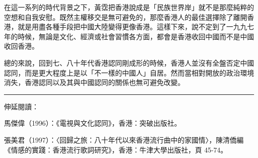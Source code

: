 在這一系列的時代背景之下，黃霑把香港說成是「民族世界岸」就不是那麼純粹的空想和自我安慰。既然主權移交是無可避免的，那麼香港人的最佳選擇除了離開香港，就是用盡各種手段把中國大陸變得更像香港。這樣下來，說不定到了一九九七年的時候，無論是文化、經濟或社會習慣各方面，都會是香港收回中國而不是中國收回香港。

總的來說，回到七、八十年代香港認同剛成形的時候，香港人並沒有全盤否定中國認同，而是更大程度上是以「不一樣的中國人」自居。然而當相對開放的政治環境消失，香港認同以及其與中國認同的關係也無可避免改變。

\rule[-10pt]{15cm}{0.05em}

伸延閱讀：

馬傑偉（1996）：《電視與文化認同》，香港：突破出版社。

張美君（1997）：〈回歸之旅：八十年代以來香港流行曲中的家國情〉，陳清僑編《情感的實踐：香港流行歌詞研究》，香港：牛津大學出版社，頁 45-74。
